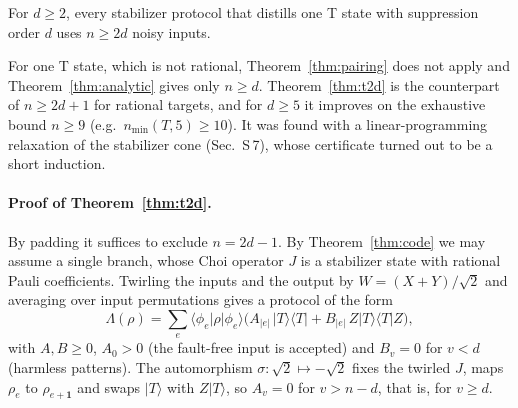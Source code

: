 
\begin{theorem}\label{thm:t2d}
For $d\geq2$, every stabilizer protocol that distills one T state with suppression order $d$ uses $n\geq2d$ noisy inputs.
\end{theorem}

For one T state, which is not rational, Theorem~\ref{thm:pairing} does not apply and Theorem~\ref{thm:analytic} gives only $n\geq d$. Theorem~\ref{thm:t2d} is the counterpart of $n\geq2d+1$ for rational targets, and for $d\geq5$ it improves on the exhaustive bound $n\geq9$ (e.g.\ $n_{\min}(T,5)\geq10$). It was found with a linear-programming relaxation of the stabilizer cone (Sec.~S\,7), whose certificate turned out to be a short induction.


\paragraph*{Proof of Theorem~\ref{thm:t2d}.}
By padding it suffices to exclude $n=2d-1$. By Theorem~\ref{thm:code} we may assume a single branch, whose Choi operator $J$ is a stabilizer state with rational Pauli coefficients. Twirling the inputs and the output by $W=(X+Y)/\sqrt2$ and averaging over input permutations gives a protocol of the form
\begin{equation}
 \Lambda(\rho)=\sum_e\langle\phi_e|\rho|\phi_e\rangle\bigl(A_{|e|}\,|T\rangle\langle T|+B_{|e|}\,Z|T\rangle\langle T|Z\bigr),
\end{equation}
with $A,B\geq0$, $A_0>0$ (the fault-free input is accepted) and $B_v=0$ for $v<d$ (harmless patterns). The automorphism $\sigma:\sqrt2\mapsto-\sqrt2$ fixes the twirled $J$, maps $\rho_e$ to $\rho_{e+\mathbf1}$ and swaps $|T\rangle$ with $Z|T\rangle$, so $A_v=0$ for $v>n-d$, that is, for $v\geq d$.

